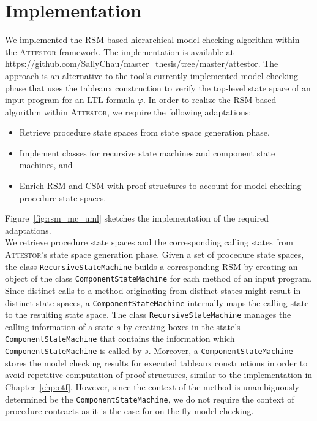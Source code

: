 \documentclass[a4paper, 12pt, twoside]{report}
\begin{document}
	\section{Implementation}
	
	We implemented the RSM-based hierarchical model checking algorithm within the \textsc{Attestor} framework. The implementation is available at \url{https://github.com/SallyChau/master_thesis/tree/master/attestor}. The approach is an alternative to the tool's currently implemented model checking phase that uses the tableaux construction to verify the top-level state space of an input program for an LTL formula $\varphi$. In order to realize the RSM-based algorithm within \textsc{Attestor}, we require the following adaptations:
	\begin{itemize}
		\item Retrieve procedure state spaces from state space generation phase,
		\item Implement classes for recursive state machines and component state machines, and
		\item Enrich RSM and CSM with proof structures to account for model checking procedure state spaces.
	\end{itemize}	
	
	Figure~\ref{fig:rsm_mc_uml} sketches the implementation of the required adaptations.\\

	We retrieve procedure state spaces and the corresponding calling states from \textsc{Attestor}'s state space generation phase. Given a set of procedure state spaces, the class \texttt{RecursiveStateMachine} builds a corresponding RSM by creating an object of the class \texttt{ComponentStateMachine} for each method of an input program. Since distinct calls to a method originating from distinct states might result in distinct state spaces, a \texttt{ComponentStateMachine} internally maps the calling state to the resulting state space. The class \texttt{RecursiveStateMachine} manages the calling information of a state $s$ by creating boxes in the state's \texttt{ComponentStateMachine} that contains the information which \texttt{ComponentStateMachine} is called by $s$. Moreover, a \texttt{ComponentStateMachine} stores the model checking results for executed tableaux constructions in order to avoid repetitive computation of proof structures, similar to the implementation in Chapter~\ref{chp:otf}. However, since the context of the method is unambiguously determined be the \texttt{ComponentStateMachine}, we do not require the context of procedure contracts as it is the case for on-the-fly model checking.\\
	
\end{document}
